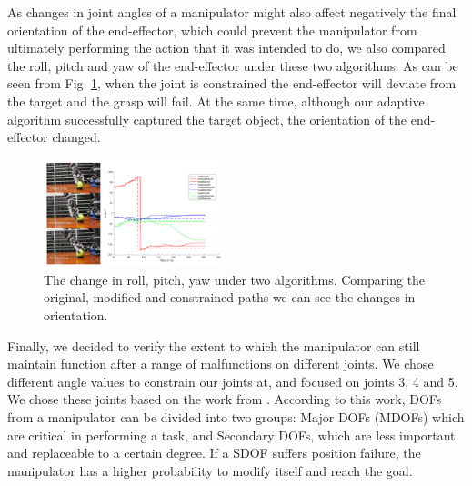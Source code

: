 \documentclass{ieeeaccess}
\begin{document}
As changes in joint angles of a manipulator might also affect negatively the final orientation of the end-effector, which could prevent the manipulator from ultimately performing the action that it was intended to do, we also compared the roll, pitch and yaw of the end-effector under these two algorithms. As can be seen from Fig. \ref{f7}, when the joint is constrained the end-effector will deviate from the target and the grasp will fail. At the same time, although our adaptive algorithm successfully captured the target object, the orientation of the end-effector changed.

\begin{figure}[tb!]
	\centering \includegraphics[width=0.47\textwidth]{img/f7.pdf} \caption{The change in roll, pitch, yaw under two algorithms. Comparing the original, modified and constrained paths we can see the changes in orientation.}
	\label{f7}
\end{figure}

Finally, we decided to verify the extent to which the manipulator can still maintain function after a range of malfunctions on different joints. We chose different angle values to constrain our joints at, and focused on joints 3, 4 and 5. We chose these joints based on the work from \cite{nakamura1987task} . According to this work, DOFs from a manipulator can be divided into two groups: Major DOFs (MDOFs) which are critical in performing a task, and Secondary DOFs, which are less important and replaceable to a certain degree. If a SDOF suffers position failure, the manipulator has a higher probability to modify itself and reach the goal.
\end{document}
